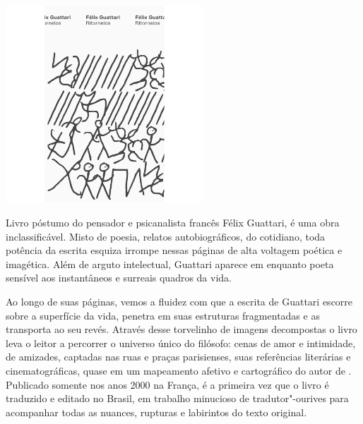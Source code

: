 \pagebreak %

\begin{center}
\hspace*{-3.6cm}
\hspace*{3.1cm}\includegraphics[width=74mm]{./grid/guattari.jpg}
\end{center}

\hspace*{-7cm}\hrulefill\hspace*{-7cm}

\medskip

\noindent{}Livro póstumo do pensador e psicanalista francês Félix Guattari, {} é uma obra inclassificável. Misto de poesia, relatos autobiográficos, {} do cotidiano, toda potência da escrita esquiza irrompe nessas páginas de alta voltagem poética e imagética. Além de arguto intelectual, Guattari aparece em {} enquanto poeta sensível aos instantâneos e surreais quadros da vida.

Ao longo de suas páginas, vemos a fluidez com que a escrita de Guattari escorre sobre a superfície da vida, penetra em suas estruturas fragmentadas e as transporta ao seu revés. Através desse torvelinho de imagens decompostas o livro leva o leitor a percorrer o universo único do filósofo: cenas de amor e intimidade, de amizades, captadas nas ruas e praças parisienses, suas referências literárias e cinematográficas, quase em um mapeamento afetivo e cartográfico do autor de {}. Publicado somente nos anos 2000 na França, é a primeira vez que o livro é traduzido e editado no Brasil, em trabalho minucioso de tradutor"-ourives para acompanhar todas as nuances, rupturas e labirintos do texto original.


